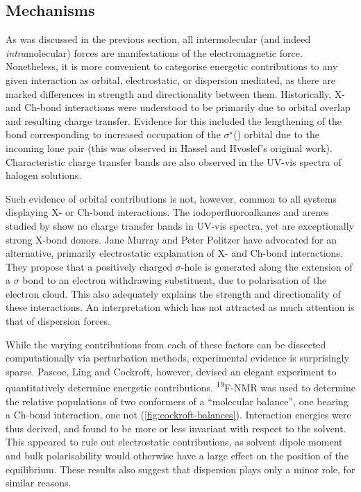 \begin{refsection}
\subsection{Mechanisms}
As was discussed in the previous section, all intermolecular (and indeed \emph{intra}mole\-cular) forces are manifestations of the electromagnetic force.
Nonetheless, it is more convenient to categorise energetic contributions to any given interaction as orbital, electrostatic, or dispersion mediated, as there are marked differences in strength and directionality between them.
Historically, X- and Ch-bond interactions were understood to be primarily due to orbital overlap and resulting charge transfer.
Evidence for this included the lengthening of the  bond corresponding to increased occupation of the $\sigma^{\star}$() orbital due to the incoming lone pair (this was observed in Hassel and Hvoslef's original work\autocite{Hassel1954}).
Characteristic charge transfer bands are also observed in the UV-vis spectra of halogen solutions.\autocite{Blackstock1987}

Such evidence of orbital contributions is not, however, common to all systems displaying X- or Ch-bond interactions.
The iodoperfluoroalkanes and arenes studied by \citeauthor{Yan2014} show no charge transfer bands in UV-vis spectra, yet are exceptionally strong X-bond donors.\autocite{Yan2014}
Jane Murray and Peter Politzer have advocated for an alternative, primarily electrostatic explanation of X- and Ch-bond interactions.\autocite{Murray2008,Murray2009}
They propose that a positively charged $ \sigma $-hole is generated along the extension of a $ \sigma $ bond to an electron withdrawing substituent, due to polarisation of the electron cloud.
This also adequately explains the strength and directionality of these interactions.
An interpretation which has not attracted as much attention is that of dispersion forces.

While the varying contributions from each of these factors can be dissected computationally via perturbation methods, experimental evidence is surprisingly sparse.
Pascoe, Ling and Cockroft, however, devised an elegant experiment to quantitatively determine energetic contributions.\autocite{Pascoe2017}
\textsuperscript{19}F-NMR was used to determine the relative populations of two conformers of a ``molecular balance'', one bearing a Ch-bond interaction, one not (\cref{fig:cockroft-balances}).
Interaction energies were thus derived, and found to be more or less invariant with respect to the solvent.
This appeared to rule out electrostatic contributions, as solvent dipole moment and bulk polarisability would otherwise have a large effect on the position of the equilibrium.
These results also suggest that dispersion plays only a minor role, for similar reasons.


\end{refsection}

